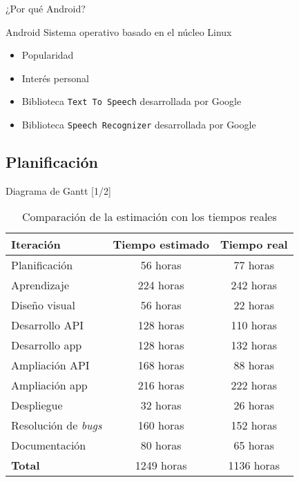\documentclass[10pt,xcolor=svgnames]{beamer}
\begin{document}
\begin{frame}{¿Por qué Android?}
  \transdissolve
  
  \begin{block}{Android}
    Sistema operativo basado en el núcleo Linux\\
  \end{block}
  
  \begin{itemize}
  \item Popularidad
  \item Interés personal
  \item Biblioteca \texttt{Text To Speech} desarrollada por Google
  \item Biblioteca \texttt{Speech Recognizer} desarrollada por Google
  \end{itemize}
\end{frame}


\subsection{Planificación}

\begin{frame}{Diagrama de Gantt [1/2]}
  \transdissolve
  \begin{cambiarmargen}{-2.5cm}{-2.5cm}

    \begin{table}[hbtp]
      \centering
      \begin{tabular}{|l|c|c|}
        \hline
        \textbf{Iteración} & \textbf{Tiempo estimado} & \textbf{Tiempo real} \\
        \hline
        Planificación & 56 horas & 77 horas \\
        \hline
        Aprendizaje & 224 horas & 242 horas \\
        \hline
        Diseño visual & 56 horas & 22 horas \\
        \hline
        Desarrollo API & 128 horas & 110 horas \\
        \hline
        Desarrollo app & 128 horas & 132 horas \\
        \hline
        Ampliación API & 168 horas & 88 horas \\
        \hline
        Ampliación app & 216 horas & 222 horas \\
        \hline
        Despliegue & 32 horas & 26 horas \\
        \hline
        Resolución de \textit{bugs} & 160 horas & 152 horas \\
        \hline
        Documentación & 80 horas & 65 horas \\
        \hline
        \textbf{Total} & 1249 horas & 1136 horas \\
        \hline
      \end{tabular}
      \caption{Comparación de la estimación con los tiempos reales}
      \label{tab:estimacion_tiempo}
    \end{table}
    
  \end{cambiarmargen}
\end{frame}
\end{document}
